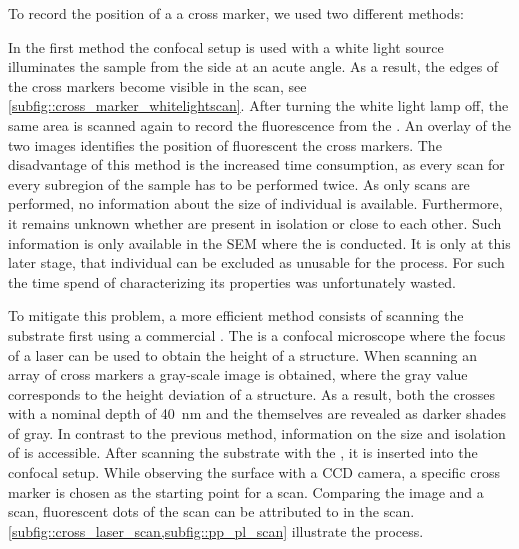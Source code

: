 		To record the position of a \nd \wrt a cross marker, we used two different methods:

		In the first method the confocal setup is used with a white light source illuminates the sample from the side at an acute angle. As a result, the edges of the cross markers become visible in the \fl scan, see \cref{subfig::cross_marker_whitelightscan}. After turning the white light lamp off, the same area is scanned again to record the fluorescence from the \sivs. An overlay of the two images identifies the position of fluorescent \sivs \wrt the cross markers. The disadvantage of this method is the increased time consumption, as every scan for every subregion of the sample has to be performed twice. As only \fl scans are performed, no information about the size of individual \nds is available. Furthermore, it remains unknown whether \nds are present in isolation or close to each other. Such information is only available in the SEM where the \pp is conducted. It is only at this later stage, that individual \nds can be excluded as unusable for the \pp process. For such \nds the time spend of characterizing its properties was unfortunately wasted.

		To mitigate this problem, a more efficient method consists of scanning the substrate first using a commercial \lsm. The \lsm is a confocal microscope where the focus of a laser can be used to obtain the height of a structure. When scanning an array of cross markers a gray-scale image is obtained, where the gray value corresponds to the height deviation of a structure. As a result, both the crosses with a nominal depth of \SI{40}{\nm} and the \nds themselves are revealed as darker shades of gray. In contrast to the previous method, information on the size and isolation of \nds is accessible. After scanning the substrate with the \lsm, it is inserted into the confocal setup. While observing the surface with a CCD camera, a specific cross marker is chosen as the starting point for a \fl scan. Comparing the \lsm image and a \fl scan, fluorescent dots of the \fl scan can be attributed to \nds in the \lsm scan. \cref{subfig::cross_laser_scan,subfig::pp_pl_scan} illustrate the process.

